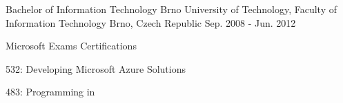 

\begin{cventries}

  \cventry
    {Bachelor of Information Technology} %
    {Brno University of Technology, Faculty of Information Technology} %
    {Brno, Czech Republic} %
    {Sep. 2008 - Jun. 2012} %
    {
    }

    \cventry
      {Microsoft Exams}
      {Certifications}
      {}
      {}
      {
        \begin{cvitems} %
          \item {532: Developing Microsoft Azure Solutions}
          \item {483: Programming in \Csharp{}}
        \end{cvitems}
      }

\end{cventries}
